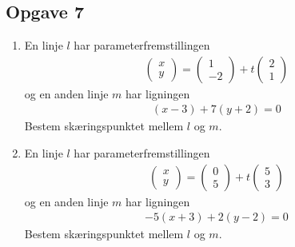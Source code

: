 \subsection*{Opgave 7}
\begin{enumerate}[label=\roman*)]
	\item En linje $l$ har parameterfremstillingen 
	\begin{align*}
		\begin{pmatrix}
			x \\ y
		\end{pmatrix} = 
		\begin{pmatrix}
			1 \\ -2
		\end{pmatrix} + t
		\begin{pmatrix}
			2 \\ 1
		\end{pmatrix}
	\end{align*}
	og en anden linje $m$ har ligningen
	\begin{align*}
		(x-3) + 7(y+2) = 0
	\end{align*}
	Bestem skæringspunktet mellem $l$ og $m$. 
	\item En linje $l$ har parameterfremstillingen 
	\begin{align*}
		\begin{pmatrix}
			x \\ y
		\end{pmatrix} = 
		\begin{pmatrix}
			0 \\ 5
		\end{pmatrix} + t
		\begin{pmatrix}
			5 \\ 3
		\end{pmatrix}
	\end{align*}
	og en anden linje $m$ har ligningen
	\begin{align*}
		-5(x+3) + 2(y-2) = 0
	\end{align*}
	Bestem skæringspunktet mellem $l$ og $m$. 
\end{enumerate}